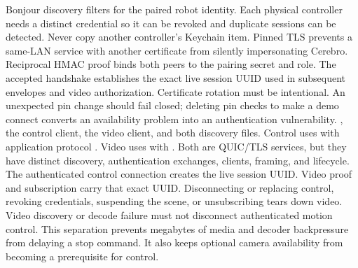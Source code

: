{}Bonjour  discovery filters for the paired robot identity. Each physical controller needs a distinct credential so it can be revoked and duplicate sessions can be detected. Never copy another controller's Keychain item.\markdownRendererParagraphSeparator
{}Pinned TLS prevents a same-LAN service with another certificate from silently impersonating Cerebro. Reciprocal HMAC proof binds both peers to the pairing secret and role. The accepted handshake establishes the exact live session UUID used in subsequent envelopes and video authorization.\markdownRendererParagraphSeparator
{}Certificate rotation must be intentional. An unexpected pin change should fail closed; deleting pin checks to make a demo connect converts an availability problem into an authentication vulnerability.\markdownRendererInterblockSeparator
{}
\markdownRendererSectionEnd \markdownRendererSectionBegin
{}\markdownRendererInterblockSeparator
{}\markdownRendererBlockQuoteBegin
{} , the control client, the video client, and both discovery files.\markdownRendererBlockQuoteEnd \markdownRendererInterblockSeparator
{}Control uses  with application protocol . Video uses  with . Both are QUIC/TLS services, but they have distinct discovery, authentication exchanges, clients, framing, and lifecycle.\markdownRendererParagraphSeparator
{}The authenticated control connection creates the live session UUID. Video proof and subscription carry that exact UUID. Disconnecting or replacing control, revoking credentials, suspending the scene, or unsubscribing tears down video. Video discovery or decode failure must not disconnect authenticated motion control.\markdownRendererParagraphSeparator
{}This separation prevents megabytes of media and decoder backpressure from delaying a stop command. It also keeps optional camera availability from becoming a prerequisite for control.\markdownRendererInterblockSeparator
{}
\markdownRendererSectionEnd \markdownRendererSectionBegin
{}\markdownRendererInterblockSeparator
